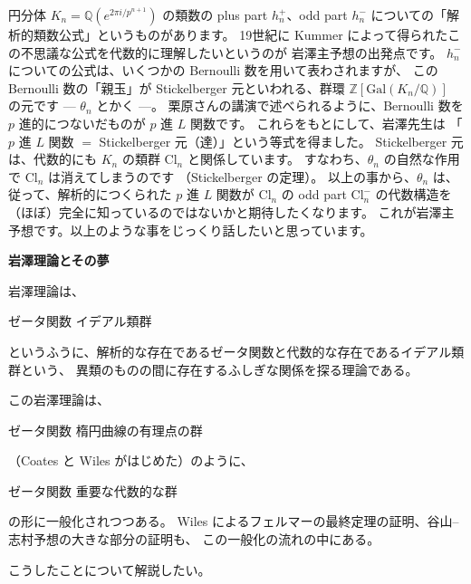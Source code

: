 \documentclass[uplatex,dvipdfmx]{jlreq}
\begin{document}
\bigskip
\hspace*{\fill}{\large\bfseries 市村　文男（横浜市大・理）}

\bigskip

円分体 $K_n = \mathbb{Q}(e^{2\pi i/p^{n+1}})$ の類数の
plus part $h_n^+$、odd part $h_n^-$ についての「解析的類数公式」というものがあります。
19世紀に Kummer によって得られたこの不思議な公式を代数的に理解したいというのが
岩澤主予想の出発点です。
$h_n^-$ についての公式は、いくつかの Bernoulli 数を用いて表わされますが、
この Bernoulli 数の「親玉」が Stickelberger 元といわれる、群環
$\mathbb{Z}[\mathrm{Gal}(K_n/\mathbb{Q})]$ の元です --- $\theta_n$ とかく ---。
栗原さんの講演で述べられるように、Bernoulli 数を $p$ 進的につないだものが
$p$ 進 $L$ 関数です。
これらをもとにして、岩澤先生は
「$p$ 進 $L$ 関数 $=$ Stickelberger 元（達）」という等式を得ました。
Stickelberger 元は、代数的にも $K_n$ の類群 $\mathrm{Cl}_n$ と関係しています。
すなわち、$\theta_n$ の自然な作用で $\mathrm{Cl}_n$ は消えてしまうのです
（Stickelberger の定理）。
以上の事から、$\theta_n$ は、従って、解析的につくられた $p$ 進 $L$ 関数が
$\mathrm{Cl}_n$ の odd part $\mathrm{Cl}_n^-$ の代数構造を
（ほぼ）完全に知っているのではないかと期待したくなります。
これが岩澤主予想です。以上のような事をじっくり話したいと思っています。

\newpage

\begin{center}
  {\Large\bfseries 岩澤理論とその夢}
\end{center}

\bigskip
\hspace*{\fill}{\large\bfseries 加藤　和也（東大・数理）}

\bigskip

岩澤理論は、
\begin{center}
  ゼータ関数
  イデアル類群
\end{center}
というふうに、解析的な存在であるゼータ関数と代数的な存在であるイデアル類群という、
異類のものの間に存在するふしぎな関係を探る理論である。

この岩澤理論は、
\begin{center}
  ゼータ関数
  楕円曲線の有理点の群
\end{center}
（Coates と Wiles がはじめた）のように、
\begin{center}
  ゼータ関数
  重要な代数的な群
\end{center}
の形に一般化されつつある。
Wiles によるフェルマーの最終定理の証明、谷山--志村予想の大きな部分の証明も、
この一般化の流れの中にある。

こうしたことについて解説したい。
\end{document}
